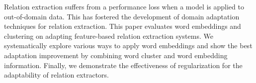 Relation extraction suffers from a performance loss when a model is applied to out-of-domain data. This has fostered the development of domain adaptation techniques for relation extraction. This paper evaluates word embeddings and clustering on adapting feature-based relation extraction systems. We systematically explore various ways to apply word embeddings and show the best adaptation improvement by combining word cluster and word embedding information. Finally, we demonstrate the effectiveness of regularization for the adaptability of relation extractors.
